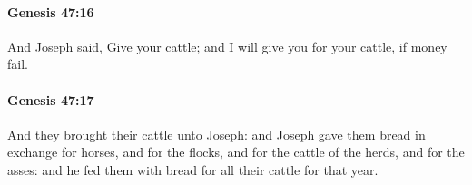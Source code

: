 		\paragraph{Genesis 47:16} %
			\label{GENESIS-47-16}

			And Joseph said, Give your cattle; and I will give you for your cattle, if money fail.


		\paragraph{Genesis 47:17} %
			\label{GENESIS-47-17}

			And they brought their cattle unto Joseph: and Joseph gave them bread in exchange for horses, and for the flocks, and for the cattle of the herds, and for the asses: and he fed them with bread for all their cattle for that year.


